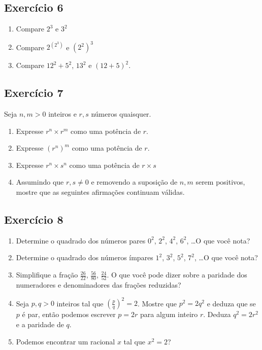 \subsection*{Exercício 6}

\begin{enumerate}
\item Compare $2^3$ e $3^2$
\item Compare $2^{\left(2^3\right)}$ e ${\left(2^2\right)}^3$
\item Compare $12^2 + 5^2$, $13^2$ e $\left(12+5\right)^2$.
\end{enumerate}

\subsection*{Exercício 7}

Seja $n, m > 0$ inteiros e $r, s$ números quaisquer.

\begin{enumerate}
\item Expresse $r^n \times r^m$ como uma potência de $r$.
\item Expresse $\left(r^{n}\right)^m$ como uma potência de $r$.
\item Expresse $r^n \times s^n$ como uma potência de $r \times s$
\item Assumindo que $r, s \neq 0$ e removendo a suposição de $n, m$ serem
  positivos, mostre que as seguintes afirmações continuam válidas.
\end{enumerate}

\subsection*{Exercício 8}

\begin{enumerate}
\item Determine o quadrado dos números pares
  $0^2$, $2^2$, $4^2$, $6^2$, \ldots O que você nota?
\item Determine o quadrado dos números ímpares
  $1^2$, $3^2$, $5^2$, $7^2$, \ldots O que você nota?
\item Simplifique a fração $\frac{26}{22}$, $\frac{56}{80}$, $\frac{24}{52}$.
  O que você pode dizer sobre a paridade dos numeradores e denominadores das
  frações reduzidas?
\item Seja $p, q > 0$ inteiros tal que
  $\left(\frac{p}{q}\right)^2 = 2$.
  Mostre que $p^2 = 2 q^2$ e deduza que se $p$ é par, então podemos escrever $p
  = 2 r$ para algum inteiro $r$. Deduza $q^2 = 2 r^2$ e a paridade de $q$.
\item Podemos encontrar um racional $x$ tal que $x^2 = 2$?
\end{enumerate}


